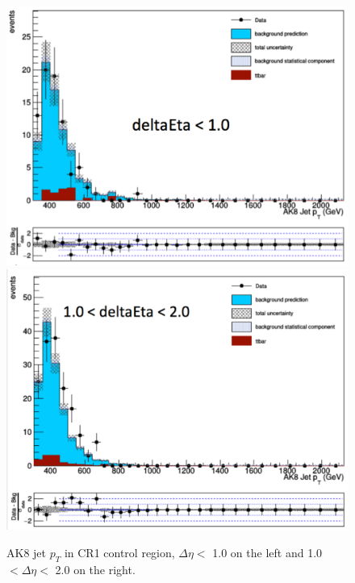 \begin{figure}[thb!]
\begin{center}
\includegraphics[scale=0.25]{Figures/CR1FJPTdeta0.pdf}
\includegraphics[scale=0.25]{Figures/CR1FJPTdeta1.pdf}
\end{center}
\caption{AK8 jet $p_{T}$ in CR1 control region, $\Delta \eta <$ 1.0 on the left and 1.0 $ < \Delta \eta <$ 2.0 on the right.}
\label{fig:CR1fjpt}
\end{figure}

